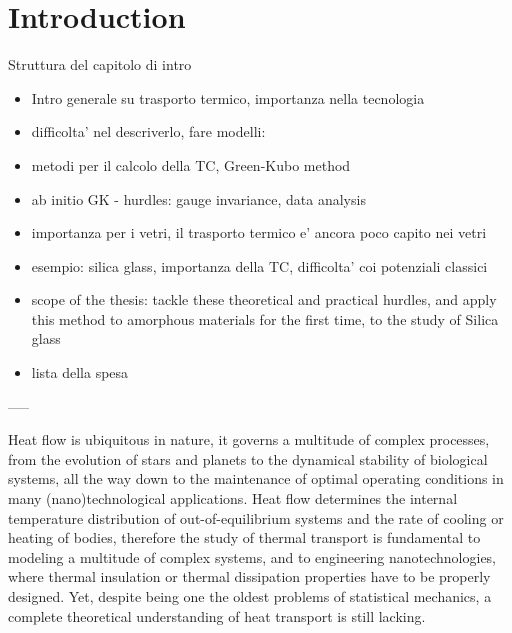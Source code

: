 \chapter{Introduction}

\begin{LEtext}
Struttura del capitolo di intro
\begin{itemize}
    \item Intro generale su trasporto termico, importanza nella tecnologia
    \item difficolta' nel descriverlo, fare modelli: 
    \item metodi per il calcolo della TC, Green-Kubo method
    \item ab initio GK - hurdles: gauge invariance, data analysis
    \item importanza per i vetri, il trasporto termico e' ancora poco capito nei vetri
    \item esempio: silica glass, importanza della TC, difficolta' coi potenziali classici
    \item scope of the thesis: tackle these theoretical and practical hurdles, and apply this method to amorphous materials for the first time, to the study of Silica glass
    \item lista della spesa
\end{itemize}
-----
\end{LEtext}
\bigskip

Heat flow is ubiquitous in nature, it governs a multitude of complex processes, from the evolution of stars and planets to the dynamical stability of biological systems, all the way down to the maintenance of optimal operating conditions in many (nano)technological applications. 
Heat flow determines the internal temperature distribution of out-of-equilibrium systems and the rate of cooling or heating of bodies, therefore the study of thermal transport is fundamental to modeling a multitude of complex systems, and to engineering nanotechnologies, where thermal insulation or thermal dissipation properties have to be properly designed. 
Yet, despite being one the oldest problems of statistical mechanics, a complete theoretical understanding of heat transport is still lacking. 

